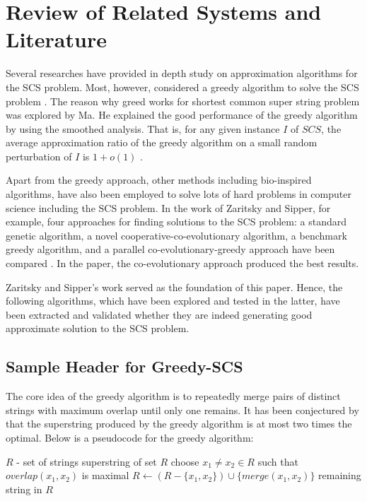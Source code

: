\chapter{Review of Related Systems and Literature}

Several researches have provided in depth study on approximation
algorithms for the SCS problem. Most, however, considered a greedy algorithm to solve the SCS problem \cite{Ma2009, Turner1989, Zaritsky2004}.
The reason why greed works for shortest common super string problem was
explored by Ma. He explained the good performance of the greedy algorithm by using the smoothed analysis. That is, for any  given instance $I$ of $SCS$, the average approximation ratio of the greedy algorithm on a small random perturbation of $I$ is $1+o(1)$ \cite{Ma2009}. 

Apart from the greedy approach, other methods including bio-inspired
algorithms, have also been employed to solve lots of hard problems in 
computer science including the SCS problem. 
In the work of Zaritsky and Sipper, for example, four approaches for 
finding solutions to the SCS problem: a 
standard genetic algorithm, a novel cooperative-co-evolutionary 
algorithm, a benchmark greedy algorithm, and a parallel 
co-evolutionary-greedy approach have been compared \cite{Zaritsky2004}. In the paper,
the co-evolutionary approach produced the best results.

Zaritsky and Sipper's work served as the foundation of this paper. Hence, the following  algorithms, which have been explored and tested in the latter, have been extracted and validated whether they are indeed generating good approximate solution to the SCS problem.

\section{Sample Header for Greedy-SCS}

The core idea of the greedy algorithm is to repeatedly merge
 pairs of distinct strings with maximum overlap until only one remains.
 It has been conjectured by \cite{MaierStorer1777} that the superstring
 produced by the greedy algorithm is at most two times the optimal.
Below is a pseudocode for the greedy algorithm:

\begin{algorithm}[H]
	\begin{algorithmic}[1]
	\REQUIRE $R$ - set of strings
	\ENSURE superstring of set $R$
		\STATE choose $x_1 \neq x_2 \in R$ such that $overlap(x_1,x_2)$ is maximal 
		\STATE $R \leftarrow (R - \{x_1, x_2\}) \cup \{merge(x_1, x_2)\}$
	\ENDWHILE
	\RETURN remaining string in $R$
	\end{algorithmic}
	\caption{GREEDY(R)}
	\label{alg:seq}
\end{algorithm}

